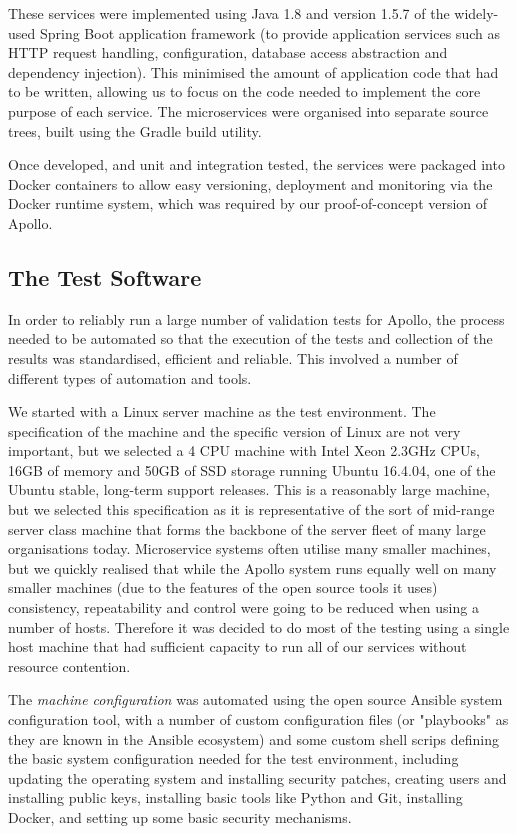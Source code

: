  These services were implemented using Java 1.8 and version 1.5.7 of the widely-used Spring Boot application framework (to provide application services such as HTTP request handling, configuration, database access abstraction and dependency injection).  This minimised the amount of application code that had to be written, allowing us to focus on the code needed to implement the core purpose of each service.  The microservices were organised into separate source trees, built using the Gradle build utility.

 Once developed, and unit and integration tested, the services were packaged into Docker containers to allow easy versioning, deployment and monitoring via the Docker runtime system, which was required by our proof-of-concept version of Apollo.

\subsection{The Test Software}

In order to reliably run a large number of validation tests for Apollo, the process needed to be automated so that the execution of the tests and collection of the results was standardised, efficient and reliable.  This involved a number of different types of automation and tools.

We started with a Linux server machine as the test environment.  The specification of the machine and the specific version of Linux are not very important, but we selected a 4 CPU machine with Intel Xeon 2.3GHz CPUs, 16GB of memory and 50GB of SSD storage running Ubuntu 16.4.04, one of the Ubuntu stable, long-term support releases.  This is a reasonably large machine, but we selected this specification as it is representative of the sort of mid-range server class machine that forms the backbone of the server fleet of many large organisations today.  Microservice systems often utilise many smaller machines, but we quickly realised that while the Apollo system runs equally well on many smaller machines (due to the features of the open source tools it uses) consistency, repeatability and control were going to be reduced when using a number of hosts.  Therefore it was decided to do most of the testing using a single host machine that had sufficient capacity to run all of our services without resource contention.

The \emph{machine configuration} was automated using the open source Ansible system configuration tool, with a number of custom configuration files (or "playbooks" as they are known in the Ansible ecosystem) and some custom shell scrips defining the basic system configuration needed for the test environment, including updating the operating system and installing security patches, creating users and installing public keys, installing basic tools like Python and Git, installing Docker, and setting up some basic security mechanisms.

